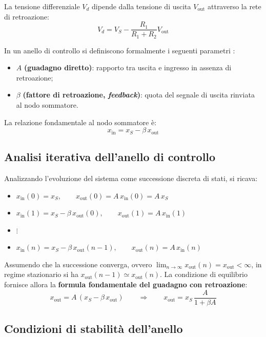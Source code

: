 \noindent
La tensione differenziale $V_d$ dipende dalla tensione di uscita $V_{\mathrm{out}}$ attraverso la rete di retroazione:
\[ V_d = V_S - \frac{R_1}{R_1 + R_2} V_{\mathrm{out}} \]

\noindent
In un anello di controllo si definiscono formalmente i seguenti parametri \cite{sedra}:
\begin{itemize}[noitemsep, leftmargin=*]
    \item $A$ \textbf{(guadagno diretto)}: rapporto tra uscita e ingresso in assenza di retroazione;
    \item $\beta$ \textbf{(fattore di retroazione, \textit{feedback})}: quota del segnale di uscita rinviata al nodo sommatore.
\end{itemize}
La relazione fondamentale al nodo sommatore è:
\[
    x_{\mathrm{in}} = x_S - \beta\, x_{\mathrm{out}}
\]

\subsection*{Analisi iterativa dell'anello di controllo}

Analizzando l'evoluzione del sistema come successione discreta di stati, si ricava:
\begin{itemize}[noitemsep, leftmargin=*]
    \item $x_{\mathrm{in}}(0) = x_S, \qquad x_{\mathrm{out}}(0) = A\,x_{\mathrm{in}}(0) = A\,x_S$
    \item $x_{\mathrm{in}}(1) = x_S - \beta\,x_{\mathrm{out}}(0), \qquad x_{\mathrm{out}}(1) = A\,x_{\mathrm{in}}(1)$
    \item $\vdots$
    \item $x_{\mathrm{in}}(n) = x_S - \beta\,x_{\mathrm{out}}(n-1), \qquad x_{\mathrm{out}}(n) = A\,x_{\mathrm{in}}(n)$
\end{itemize}

\noindent
Assumendo che la successione converga, ovvero $\lim_{n \to \infty} x_{\mathrm{out}}(n) = x_{\mathrm{out}} < \infty$, in regime stazionario si ha $x_{\mathrm{out}}(n-1) \simeq x_{\mathrm{out}}(n)$. La condizione di equilibrio fornisce allora la \textbf{formula fondamentale del guadagno con retroazione}:
\[
    x_{\mathrm{out}} = A\,(x_S - \beta\,x_{\mathrm{out}})
    \qquad\Longrightarrow\qquad
    \boxed{x_{\mathrm{out}} = x_S \, \frac{A}{1 + \beta A}}
\]

\subsection*{Condizioni di stabilità dell'anello}

